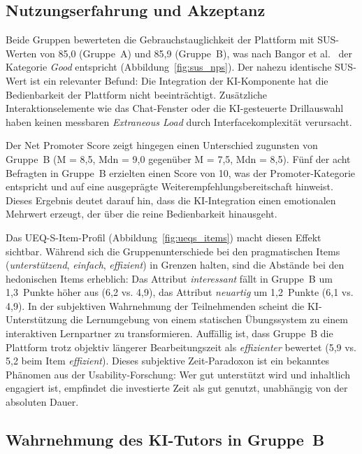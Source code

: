 \subsection{Nutzungserfahrung und Akzeptanz}\label{subsec:diskussion_ux}

Beide Gruppen bewerteten die Gebrauchstauglichkeit der Plattform mit SUS-Werten von 85{,}0 (Gruppe~A) und 85{,}9 (Gruppe~B), was nach Bangor et al.~\cite{bangor2009} der Kategorie \textit{Good} entspricht (Abbildung~\ref{fig:sus_nps}). Der nahezu identische SUS-Wert ist ein relevanter Befund: Die Integration der KI-Komponente hat die Bedienbarkeit der Plattform nicht beeinträchtigt. Zusätzliche Interaktionselemente wie das Chat-Fenster oder die KI-gesteuerte Drillauswahl haben keinen messbaren \textit{Extraneous Load} durch Interfacekomplexität verursacht.

Der Net Promoter Score zeigt hingegen einen Unterschied zugunsten von Gruppe~B (M = 8{,}5, Mdn = 9{,}0 gegenüber M = 7{,}5, Mdn = 8{,}5). Fünf der acht Befragten in Gruppe~B erzielten einen Score von 10, was der Promoter-Kategorie entspricht und auf eine ausgeprägte Weiterempfehlungsbereitschaft hinweist. Dieses Ergebnis deutet darauf hin, dass die KI-Integration einen emotionalen Mehrwert erzeugt, der über die reine Bedienbarkeit hinausgeht.

Das UEQ-S-Item-Profil (Abbildung~\ref{fig:ueqs_items}) macht diesen Effekt sichtbar. Während sich die Gruppenunterschiede bei den pragmatischen Items (\textit{unterstützend}, \textit{einfach}, \textit{effizient}) in Grenzen halten, sind die Abstände bei den hedonischen Items erheblich: Das Attribut \textit{interessant} fällt in Gruppe~B um 1{,}3~Punkte höher aus (6{,}2 vs. 4{,}9), das Attribut \textit{neuartig} um 1{,}2~Punkte (6{,}1 vs. 4{,}9). In der subjektiven Wahrnehmung der Teilnehmenden scheint die KI-Unterstützung die Lernumgebung von einem statischen Übungssystem zu einem interaktiven Lernpartner zu transformieren. Auffällig ist, dass Gruppe~B die Plattform trotz objektiv längerer Bearbeitungszeit als \textit{effizienter} bewertet (5{,}9 vs. 5{,}2 beim Item \textit{effizient}). Dieses subjektive Zeit-Paradoxon ist ein bekanntes Phänomen aus der Usability-Forschung: Wer gut unterstützt wird und inhaltlich engagiert ist, empfindet die investierte Zeit als gut genutzt, unabhängig von der absoluten Dauer.

\subsection{Wahrnehmung des KI-Tutors in Gruppe~B}\label{subsec:diskussion_ki_wahrnehmung}

